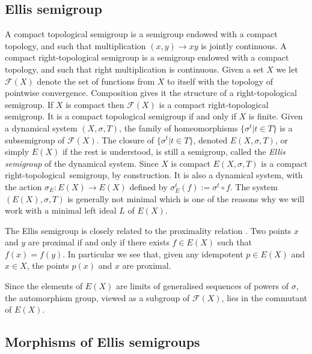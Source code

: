 \documentclass[12pt]{amsart}
\theoremstyle{definition}
\numberwithin{equation}{section}
\newcommand{\Ff}{{\mathcal F}}
\newcommand{\rst}{right-topological}
\begin{document}
\subsection{Ellis semigroup} 
A compact  topological semigroup is a semigroup endowed with a compact topology, and 
such that  multiplication  $(x,y)\rightarrow xy$ is jointly continuous.
A compact right-topological semigroup is a semigroup endowed with a compact topology, and such that right multiplication  is continuous.  
Given a set $X$ we let $\Ff(X)$ denote the set of functions from $X$ to itself with the topology of pointwise convergence. Composition gives it the structure of a right-topological semigroup. If $X$ is compact then $\Ff(X)$ is a compact right-topological semigroup. It is  a compact topological semigroup if and only if $X$ is finite. 
Given a dynamical system $(X,\sigma, T)$, the family of homeomorphisms
$\{\sigma^t | t\in T\}$ is a subsemigroup of $\mathcal F(X)$. 
The closure of $\{\sigma^t | t\in T\}$, denoted $E(X, \sigma, T)$,  or simply $E(X)$ if the rest is understood, is still a semigroup, called the   {\em Ellis semigroup}  of the dynamical system. 
Since $X$ is compact 
$E(X, \sigma,T)$ is 
a compact \rst\ semigroup, by construction.  It is also a dynamical system, with the action $\sigma_E:E(X) \rightarrow E(X)$ defined by  $\sigma_E^t(f):= \sigma^{t}\circ f$. The system $(E(X), \sigma,T)$ is generally not minimal which is one of the reasons why we will work with a minimal left ideal $L$ of $E(X)$.






The Ellis semigroup is closely related to the proximality relation \cite[Chapter 3, Proposition 8]{Auslander1988}. 
Two points $x$ and $y$ are proximal if and only if there exists $f\in E(X)$ such that $f(x)=f(y)$. 
In particular we see that, given any idempotent $p\in E(X)$ and $x\in X$, the points $p(x)$ and $x$ are proximal.


Since the elements of $E(X)$ are limits of generalised sequences of powers of $\sigma$, the automorphism group, viewed as a subgroup of $\Ff(X)$, lies in the commutant of $E(X)$. 
 
\subsection{Morphisms of Ellis semigroups}
\end{document}
